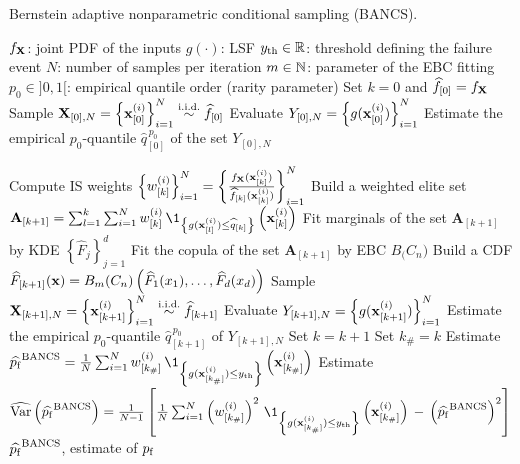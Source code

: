 \begin{algorithm}[h]
    \caption{Bernstein adaptive nonparametric conditional sampling (BANCS).}\label{alg:bancs}
    \footnotesize
    \begin{algorithmic}[1]
        \State $f_{\bf X}$: joint PDF of the inputs
        \State $g(\cdot)$: LSF
        \State $y_\mathrm{th} \in \mathbb{R}$: threshold defining the failure event 
        \State $N$: number of samples per iteration
        \State $m \in \mathbb{N}$: parameter of the EBC fitting
        \State $p_0 \in ]0, 1[$: empirical quantile order (rarity parameter)
        \State Set $k = 0$ and $\widehat{f}_{[0]} = f_{\bf X}$
        \State Sample ${\bf X}_{[0], N} = \left\{{\bf x}_{[0]}^{(i)}\right\}_{i=1}^N \overset{\text{i.i.d.}}{\sim} \widehat{f}_{[0]}$
        \State Evaluate $Y_{[0], N} = \left\{g({\bf x}_{[0]}^{(i)})\right\}_{i=1}^N$
        \State Estimate the empirical $p_0$-quantile $\widehat{q}_{[0]}^{\, p_0}$ of the set $Y_{[0], N}$
        
        \State Compute IS weights $\left\{w_{[k]}^{(i)}\right\}_{i=1}^N = \left\{\frac{f_{\bf X}({\bf x}_{[k]}^{(i)})}{\widehat{f}_{[k]}({\bf x}_{[k]}^{(i)})}\right\}_{i=1}^N$
        \State Build a weighted elite set $\mathbf{A}_{[k+1]}=\sum_{l=1}^{k} \sum_{i=1}^N w_{[k]}^{(i)} \, \1_{\left\{g(\bx_{[l]}^{(i)}) \leq \widehat{q}_{[k]} \right\}}\left(\bx_{[k]}^{(i)}\right)$
        \State Fit marginals of the set $\mathbf{A}_{[k+1]}$ by KDE $\left\{\widehat{F}_j\right\}_{j=1}^d$
        \State Fit the copula of the set $\mathbf{A}_{[k+1]}$ by EBC $B_\bm(C_n)$
        \State Build a CDF $\widehat{F}_{[k+1]}({\bf x}) = B_m(C_n)\left(\widehat{F}_1(x_1), \dots, \widehat{F}_d(x_d)\right)$
        \State Sample ${\bf X}_{[k+1], N} = \left\{{\bf x}_{[k+1]}^{(i)}\right\}_{i=1}^N \overset{\text{i.i.d.}}{\sim} \widehat{f}_{[k+1]}$
        \State Evaluate $Y_{[k+1], N} = \left\{g({\bf x}_{[k+1]}^{(i)})\right\}_{i=1}^N$
        \State Estimate the empirical $p_0$-quantile $\widehat{q}_{[k+1]}^{\, p_0}$ of $Y_{[k+1], N}$
\State Set $k = k+1$
\EndWhile
\State Set $k_\# = k$
\State Estimate $\widehat{\pf}^{\mathrm{BANCS}} = \frac1N \sum_{i=1}^N w_{[k_\#]}^{(i)} \, \1_{\left\{g(\bx_{[k_\#]}^{(i)}) \leq \yth \right\}}\left(\bx_{[k_\#]}^{(i)}\right)$
\State Estimate $\what{\var}\left(\widehat{\pf}^{\mathrm{BANCS}}\right) = \frac{1}{N-1} \left[\frac1N \sum_{i=1}^N \left(w_{[k_\#]}^{(i)}\right)^2 \, \1_{\left\{g(\bx_{[k_\#]}^{(i)}) \leq \yth \right\}}\left(\bx_{[k_\#]}^{(i)}\right) \, - \, \left(\widehat{\pf}^{\mathrm{BANCS}}\right)^2\right]$
\State $\widehat{p_\mathrm{f}}^{\mathrm{BANCS}}$, estimate of $p_\mathrm{f}$
\end{algorithmic}
\end{algorithm}


